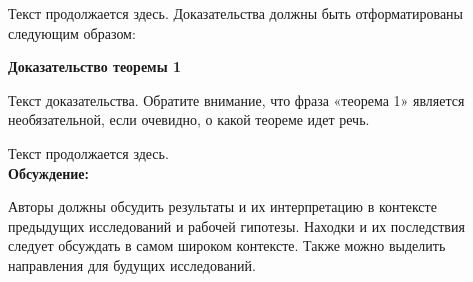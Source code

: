 \documentclass[i-edu.uz,journal,article,submit,pdftex,moreauthors]{Definitions/i-edu.uz}
\begin{document}
\begin{sloppypar}
{Текст продолжается здесь. Доказательства должны быть отформатированы следующим образом:


\begin{Theorem}
\textbf{Доказательство теоремы 1}

Текст доказательства. Обратите внимание, что фраза «теорема 1» является необязательной, если очевидно, о какой теореме идет речь.
\end{Theorem}
Текст продолжается здесь.\\

\noindent\textbf{Обсуждение:}

Авторы должны обсудить результаты и их интерпретацию в контексте предыдущих исследований и рабочей гипотезы. Находки и их последствия следует обсуждать в самом широком контексте. Также можно выделить направления для будущих исследований.

\vspace{6pt} 




}
\end{sloppypar}
\end{document}
